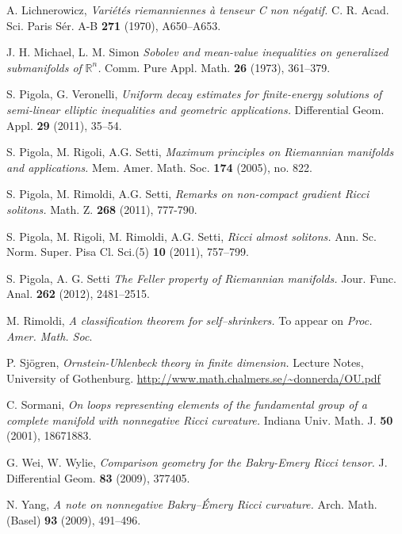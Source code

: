 \documentclass[11pt,leqno]{amsart}\usepackage{amsmath}
\numberwithin{equation}{section}
\begin{document}
\begin{thebibliography}{9}
A. Lichnerowicz, \textit{Vari\'et\'es riemanniennes \`a tenseur C non n\'egatif.}
C. R. Acad. Sci. Paris S\'er. A-B \textbf{271} (1970), A650--A653.

J. H. Michael, L. M. Simon \textit{Sobolev and
mean-value inequalities on generalized submanifolds of }$\mathbb{R}^{n}$\textit{.} Comm. Pure Appl. Math. \textbf{26} (1973), 361--379.

S. Pigola, G. Veronelli, \textit{Uniform decay estimates for
finite-energy solutions of semi-linear elliptic inequalities and geometric
applications.} Differential Geom. Appl. \textbf{29} (2011), 35--54.

 S. Pigola, M. Rigoli, A.G. Setti, \textit{Maximum principles on Riemannian manifolds and applications.} Mem. Amer. Math. Soc. \textbf{174} (2005), no. 822.

 S. Pigola, M. Rimoldi, A.G. Setti, \textit{Remarks on non-compact gradient Ricci solitons.} Math. Z. \textbf{268} (2011), 777-790.

S. Pigola, M. Rigoli, M. Rimoldi, A.G. Setti,
\textit{Ricci almost solitons.}  Ann. Sc. Norm. Super. Pisa Cl. Sci.(5)
\textbf{10} (2011), 757--799.

 S. Pigola, A. G. Setti \textit{The Feller property of Riemannian manifolds.} Jour. Func. Anal. \textbf{262} (2012), 2481--2515.

M. Rimoldi, \textit{A classification theorem for self--shrinkers.} \rm{To appear on} \emph{Proc. Amer. Math. Soc}.

P. Sj\"{o}gren, \textit{Ornstein-Uhlenbeck theory in finite dimension.} Lecture Notes, University of Gothenburg. \url{http://www.math.chalmers.se/~donnerda/OU.pdf}

C. Sormani, \textit{On loops representing elements of the fundamental group of a complete manifold with nonnegative Ricci curvature.} Indiana Univ. Math. J. \textbf{50} (2001), 18671883.

G. Wei, W. Wylie, \textit{Comparison geometry for the Bakry-Emery Ricci tensor.} J. Differential Geom. \textbf{83} (2009), 377405.

N. Yang, \textit{A note on nonnegative Bakry--\'Emery Ricci curvature.} Arch. Math. (Basel)
\textbf{93} (2009), 491--496.

\end{thebibliography}
\end{document}
